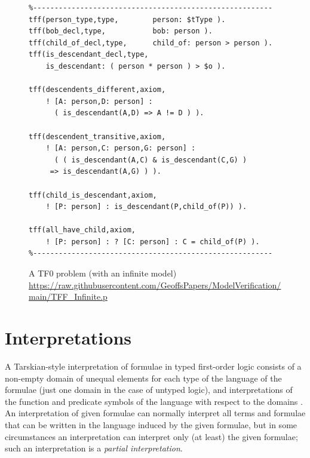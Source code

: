 \documentclass[letterpaper]{article}
\begin{document}
\begin{figure}[htbp]
\scriptsize
{}
\begin{verbatim}
%--------------------------------------------------------
tff(person_type,type,        person: $tType ).
tff(bob_decl,type,           bob: person ).
tff(child_of_decl,type,      child_of: person > person ).
tff(is_descendant_decl,type, 
    is_descendant: ( person * person ) > $o ).

tff(descendents_different,axiom,
    ! [A: person,D: person] : 
      ( is_descendant(A,D) => A != D ) ).

tff(descendent_transitive,axiom,
    ! [A: person,C: person,G: person] :
      ( ( is_descendant(A,C) & is_descendant(C,G) ) 
     => is_descendant(A,G) ) ).

tff(child_is_descendant,axiom,
    ! [P: person] : is_descendant(P,child_of(P)) ).

tff(all_have_child,axiom,
    ! [P: person] : ? [C: person] : C = child_of(P) ).
%--------------------------------------------------------
\end{verbatim}
\caption{A TF0 problem (with an infinite model)\\
{\scriptsize \url{https://raw.githubusercontent.com/GeoffsPapers/ModelVerification/main/TFF_Infinite.p}}}
\label{TF0InfiniteProblem}
\end{figure}


\section{Interpretations}
\label{Interpretations}

A Tarskian-style \cite{TV56} interpretation of formulae in typed first-order logic 
consists of a non-empty domain of unequal elements for each type of the language of the formulae 
(just one domain in the case of untyped logic), and interpretations of the function and predicate 
symbols of the language with respect to the domains \cite{Hun96}.
An interpretation of given formulae can normally interpret all terms and formulae that can be 
written in the language induced by the given formulae, but in some circumstances an interpretation 
can interpret only (at least) the given formulae; such an interpretation is a {\em partial
interpretation}.
\end{document}
